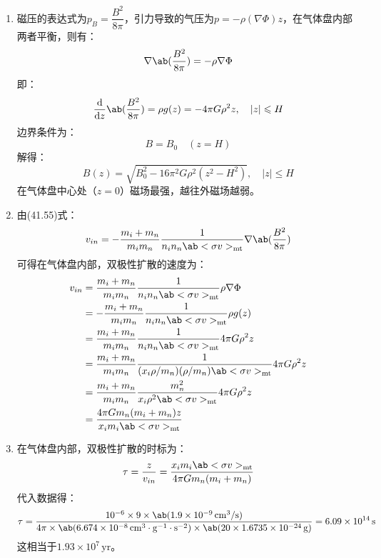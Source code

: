 \documentclass[a4paper,fontset=none]{ctexart}
\begin{document}
\begin{enumerate}
    \medskip
    \item[41.1 (b)]
    磁压的表达式为$p_B = \dfrac{B^2}{8\pi}$，引力导致的气压为$p = -\rho(\nabla\Phi)z$，在气体盘内部两者平衡，则有：
    \[
        \nabla\ab(\frac{B^2}{8\pi}) = -\rho \nabla\Phi
    \]
    即：
    \[
        \odv*{\ab(\frac{B^2}{8\pi})}{z} = \rho g(z) = -4\pi G\rho^2 z,\quad |z| \leqslant H
    \]
    边界条件为：
    \[
        B = B_0\quad (z = H)
    \]
    解得：
    \[
        B(z) = \sqrt{B_0^2 - 16\pi^2 G\rho^2 (z^2 - H^2)},\quad |z| \leqslant H
    \]
    在气体盘中心处（$z = 0$）磁场最强，越往外磁场越弱。

    \medskip
    \item[41.1 (c)]
    由(41.55)式：
    \[
        v_{in} = -\frac{m_i + m_n}{m_i m_n} \frac{1}{n_i n_n \ab<\sigma v>_{\mathrm{mt}}} \nabla\ab(\frac{B^2}{8\pi})
    \]
    可得在气体盘内部，双极性扩散的速度为：
    \begin{align*}
        v_{in}
        &= \frac{m_i + m_n}{m_i m_n} \frac{1}{n_i n_n \ab<\sigma v>_{\mathrm{mt}}} \rho \nabla\Phi \\
        &= -\frac{m_i + m_n}{m_i m_n} \frac{1}{n_i n_n \ab<\sigma v>_{\mathrm{mt}}} \rho g(z) \\
        &= \frac{m_i + m_n}{m_i m_n} \frac{1}{n_i n_n \ab<\sigma v>_{\mathrm{mt}}} 4\pi G\rho^2 z \\
        &= \frac{m_i + m_n}{m_i m_n} \frac{1}{(x_i \rho/m_n) (\rho/m_n) \ab<\sigma v>_{\mathrm{mt}}} 4\pi G\rho^2 z \\
        &= \frac{m_i + m_n}{m_i m_n} \frac{m_n^2}{x_i \rho^2 \ab<\sigma v>_{\mathrm{mt}}} 4\pi G\rho^2 z \\
        &= \frac{4\pi Gm_n (m_i + m_n) z}{x_i m_i \ab<\sigma v>_{\mathrm{mt}}}
    \end{align*}

    \medskip
    \item[41.1 (d)]
    在气体盘内部，双极性扩散的时标为：
    \[
        \tau = \frac{z}{v_{in}} = \frac{x_i m_i \ab<\sigma v>_{\mathrm{mt}}}{4\pi Gm_n (m_i + m_n)}
    \]
    代入数据得：
    \[
        \tau = \frac{10^{-6} \times 9 \times \ab(1.9 \times 10^{-9}\,\mathrm{cm^3/s})}{4\pi \times \ab(6.674 \times 10^{-8}\,\mathrm{cm^3 \cdot g^{-1} \cdot s^{-2}}) \times \ab(20 \times 1.6735 \times 10^{-24}\,\mathrm{g})} = 6.09 \times 10^{14}\,\mathrm{s}
    \]
    这相当于$1.93 \times 10^7\,\mathrm{yr}$。


\end{enumerate}
\end{document}
